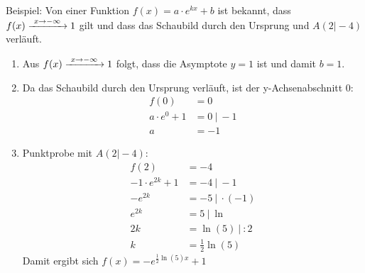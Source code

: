 Beispiel: Von einer Funktion \(f(x)=a\cdot e^{kx}+b\) ist bekannt, dass \(f(x)\xrightarrow{\hphantom{\ }x\to-\infty\hphantom{\ }}1\) gilt und dass das Schaubild durch den Ursprung und \(A(2\vert-4)\) verläuft.
\textcolor{loes}{
	\begin{enumerate}[label=\arabic*)]
		\item Aus \(f(x)\xrightarrow{\hphantom{\ }x\to-\infty\hphantom{\ }}1\) folgt, dass die Asymptote \(y=1\) ist und damit \(b=1\).
		\item Da das Schaubild durch den Ursprung verläuft, ist der y-Achsenabschnitt 0:
		\begin{align*}
			f(0)&=0\\
			a\cdot e^0+1&=0\ \vert\ -1\\
			a&=-1
		\end{align*}
		\item Punktprobe mit \(A(2\vert-4)\):
		\begin{align*}
			f(2)&=-4\\
			-1\cdot e^{2k}+1&=-4\ \vert\ -1\\
			-e^{2k}&=-5\ \vert\ \cdot(-1)\\
			e^{2k}&=5\ \vert\ \ln\\
			2k&=\ln\left(5\right)\ \vert\ :2\\
			k&=\frac{1}{2}\ln\left(5\right)
		\end{align*}
		Damit ergibt sich \(f(x)=-e^{\frac{1}{2}\ln\left(5\right)x}+1\)
\end{enumerate}}
\newpage
